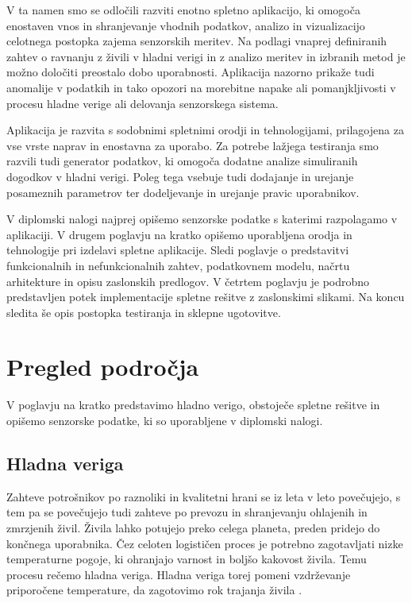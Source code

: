 \documentclass[a4paper, 12pt]{book}
\begin{document}
V ta namen smo se odločili razviti enotno spletno aplikacijo, ki omogoča enostaven vnos in shranjevanje vhodnih podatkov, analizo in vizualizacijo celotnega postopka zajema senzorskih meritev. Na podlagi vnaprej definiranih zahtev o ravnanju z živili v hladni verigi in z analizo meritev in izbranih metod je možno določiti preostalo dobo uporabnosti. Aplikacija nazorno prikaže tudi anomalije v podatkih in tako opozori na morebitne napake ali pomanjkljivosti v procesu hladne verige ali delovanja senzorskega sistema.

Aplikacija je razvita s sodobnimi spletnimi orodji in tehnologijami, prilagojena za vse vrste naprav in enostavna za uporabo. Za potrebe lažjega testiranja smo razvili tudi generator podatkov, ki omogoča dodatne analize simuliranih dogodkov v hladni verigi. Poleg tega vsebuje tudi dodajanje in urejanje posameznih parametrov ter dodeljevanje in urejanje pravic uporabnikov.

V diplomski nalogi najprej opišemo senzorske podatke s katerimi razpolagamo v aplikaciji. V drugem poglavju na kratko opišemo uporabljena orodja in tehnologije pri izdelavi spletne aplikacije. Sledi poglavje o predstavitvi funkcionalnih in nefunkcionalnih zahtev, podatkovnem modelu, načrtu arhitekture in opisu zaslonskih predlogov. V četrtem poglavju je podrobno predstavljen potek implementacije spletne rešitve z zaslonskimi slikami. Na koncu sledita še opis postopka testiranja in sklepne ugotovitve.



\chapter{Pregled področja}
\label{pregled-podrocja}

V poglavju na kratko predstavimo hladno verigo, obstoječe spletne rešitve in opišemo senzorske podatke, ki so uporabljene v diplomski nalogi.

\section{Hladna veriga}

Zahteve potrošnikov po raznoliki in kvalitetni hrani se iz leta v leto povečujejo, s tem pa se povečujejo tudi zahteve po prevozu in shranjevanju ohlajenih in zmrzjenih živil. Živila lahko potujejo preko celega planeta, preden pridejo do končnega uporabnika. Čez celoten logističen proces je potrebno zagotavljati nizke temperaturne pogoje, ki ohranjajo varnost in boljšo kakovost živila. Temu procesu rečemo hladna veriga.
Hladna veriga torej pomeni vzdrževanje priporočene temperature, da zagotovimo rok trajanja živila \cite{hladna-veriga}.
\end{document}
